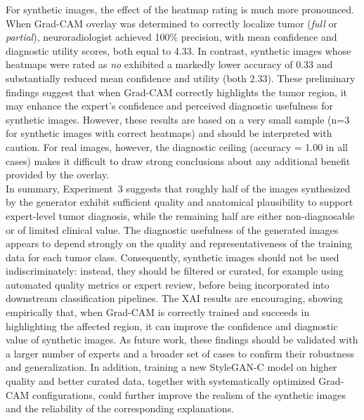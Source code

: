 For synthetic images, the effect of the heatmap rating is much more pronounced. When Grad-CAM overlay was determined to correctly localize tumor (\emph{full} or \emph{partial}), neuroradiologist achieved 100\% precision, with mean confidence and diagnostic utility scores, both equal to 4.33. In contrast, synthetic images whose heatmaps were rated as \emph{no} exhibited a markedly lower accuracy of 0.33 and substantially reduced mean confidence and utility (both 2.33). These preliminary findings suggest that when Grad-CAM correctly highlights the tumor region, it may enhance the expert's confidence and perceived diagnostic usefulness for synthetic images. However, these results are based on a very small sample (n=3 for synthetic images with correct heatmaps) and should be interpreted with caution. For real images, however, the diagnostic ceiling (accuracy = 1.00 in all cases) makes it difficult to draw strong conclusions about any additional benefit provided by the overlay. \\

In summary, Experiment~3 suggests that roughly half of the images synthesized by the generator exhibit sufficient quality and anatomical plausibility to support expert-level tumor diagnosis, while the remaining half are either non-diagnosable or of limited clinical value. The diagnostic usefulness of the generated images appears to depend strongly on the quality and representativeness of the training data for each tumor class. Consequently, synthetic images should not be used indiscriminately: instead, they should be filtered or curated, for example using automated quality metrics or expert review, before being incorporated into downstream classification pipelines. The XAI results are encouraging, showing empirically that, when Grad-CAM is correctly trained and succeeds in highlighting the affected region, it can improve the confidence and diagnostic value of synthetic images. As future work, these findings should be validated with a larger number of experts and a broader set of cases to confirm their robustness and generalization. In addition, training a new StyleGAN-C model on higher quality and better curated data, together with systematically optimized Grad-CAM configurations, could further improve the realism of the synthetic images and the reliability of the corresponding explanations.\\


